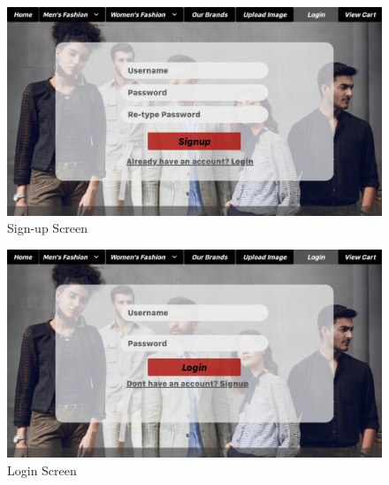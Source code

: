  \begin{figure}[H]
  \includegraphics[width=15cm]{images/SignupScreen.pdf} 
  \centering
  \caption{Sign-up Screen}
  \label{gui:sign}
  \end{figure}

  \begin{figure}[!htb]
  \includegraphics[width=15cm]{images/LoginScreen.pdf} 
  \centering
  \caption{Login Screen}
  \label{gui:login}
  \end{figure}

